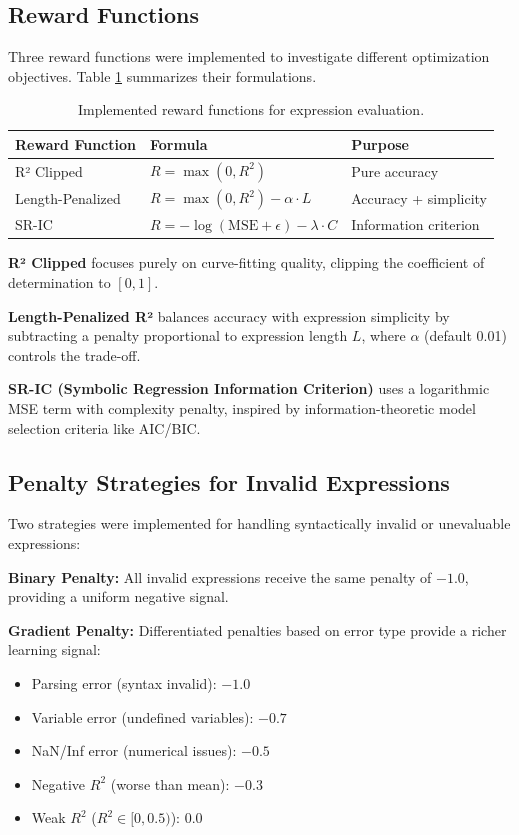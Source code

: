 \subsection{Reward Functions}
\label{sec:reward_functions}

Three reward functions were implemented to investigate different optimization objectives. Table \ref{tab:reward_functions} summarizes their formulations.

\begin{table}[h!]
    \centering
    \caption{Implemented reward functions for expression evaluation.}
    \label{tab:reward_functions}
    \begin{tabular}{lll}
    \toprule
    \textbf{Reward Function} & \textbf{Formula} & \textbf{Purpose} \\
    \midrule
    R² Clipped & $R = \max(0, R^2)$ & Pure accuracy \\
    Length-Penalized & $R = \max(0, R^2) - \alpha \cdot L$ & Accuracy + simplicity \\
    SR-IC & $R = -\log(\text{MSE} + \epsilon) - \lambda \cdot C$ & Information criterion \\
    \bottomrule
    \end{tabular}
\end{table}

\textbf{R² Clipped} focuses purely on curve-fitting quality, clipping the coefficient of determination to $[0, 1]$.

\textbf{Length-Penalized R²} balances accuracy with expression simplicity by subtracting a penalty proportional to expression length $L$, where $\alpha$ (default 0.01) controls the trade-off.

\textbf{SR-IC (Symbolic Regression Information Criterion)} uses a logarithmic MSE term with complexity penalty, inspired by information-theoretic model selection criteria like AIC/BIC.

\subsection{Penalty Strategies for Invalid Expressions}

Two strategies were implemented for handling syntactically invalid or unevaluable expressions:

\textbf{Binary Penalty:} All invalid expressions receive the same penalty of $-1.0$, providing a uniform negative signal.

\textbf{Gradient Penalty:} Differentiated penalties based on error type provide a richer learning signal:
\begin{itemize}
    \item Parsing error (syntax invalid): $-1.0$
    \item Variable error (undefined variables): $-0.7$
    \item NaN/Inf error (numerical issues): $-0.5$
    \item Negative $R^2$ (worse than mean): $-0.3$
    \item Weak $R^2$ ($R^2 \in [0, 0.5)$): $0.0$
\end{itemize}

